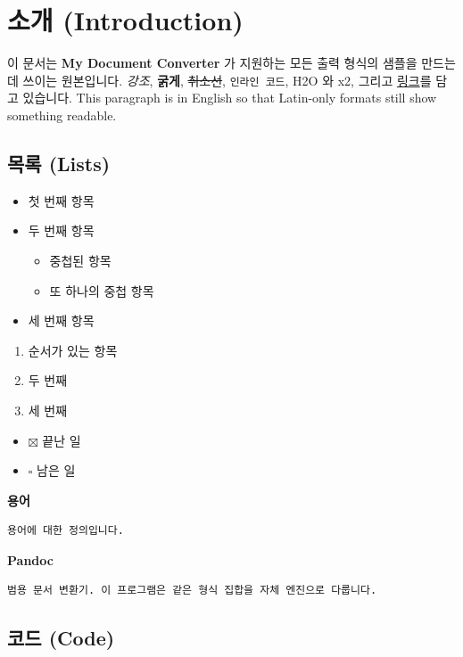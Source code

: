 \documentclass[11pt]{article}
\date{}
\begin{document}
\section*{소개 (Introduction)}\label{소개-introduction}

이 문서는 \textbf{My Document Converter} 가 지원하는 모든 출력 형식의 샘플을 만드는 데 쓰이는
원본입니다.
\emph{강조}, \textbf{굵게}, \sout{취소선}, \verb|인라인 코드|, H2O 와 x2, 그리고
\href{https://example.com}{링크}를 담고 있습니다. This paragraph is in
English so that Latin-only formats still show something readable.

\subsection*{목록 (Lists)}\label{목록-lists}

\begin{itemize}
\item 첫 번째 항목
\item 두 번째 항목
\begin{itemize}
\item 중첩된 항목
\item 또 하나의 중첩 항목
\end{itemize}
\item 세 번째 항목
\end{itemize}

\begin{enumerate}
\item 순서가 있는 항목
\item 두 번째
\item 세 번째
\end{enumerate}

\begin{itemize}
\item $\boxtimes$ 끝난 일
\item $\square$ 남은 일
\end{itemize}

\textbf{용어}

\begin{verbatim}
용어에 대한 정의입니다.
\end{verbatim}

\textbf{Pandoc}

\begin{verbatim}
범용 문서 변환기. 이 프로그램은 같은 형식 집합을 자체 엔진으로 다룹니다.
\end{verbatim}

\subsection*{코드 (Code)}\label{코드-code}
\end{document}
